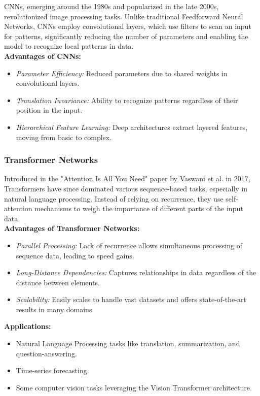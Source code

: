 CNNs, emerging around the 1980s and popularized in the late 2000s, revolutionized image processing tasks. Unlike traditional Feedforward Neural Networks, CNNs employ convolutional layers, which use filters to scan an input for patterns, significantly reducing the number of parameters and enabling the model to recognize local patterns in data.\\

\textbf{Advantages of CNNs:}
\begin{itemize}
    \item \textit{Parameter Efficiency:} Reduced parameters due to shared weights in convolutional layers.
    \item \textit{Translation Invariance:} Ability to recognize patterns regardless of their position in the input.
    \item \textit{Hierarchical Feature Learning:} Deep architectures extract layered features, moving from basic to complex.
\end{itemize}


\subsubsection*{Transformer Networks}

Introduced in the "Attention Is All You Need" paper by Vaswani et al. in 2017, Transformers have since dominated various sequence-based tasks, especially in natural language processing. Instead of relying on recurrence, they use self-attention mechanisms to weigh the importance of different parts of the input data.\\

\textbf{Advantages of Transformer Networks:}
\begin{itemize}
    \item \textit{Parallel Processing:} Lack of recurrence allows simultaneous processing of sequence data, leading to speed gains.
    \item \textit{Long-Distance Dependencies:} Captures relationships in data regardless of the distance between elements.
    \item \textit{Scalability:} Easily scales to handle vast datasets and offers state-of-the-art results in many domains.
\end{itemize}

\textbf{Applications:}
\begin{itemize}
    \item Natural Language Processing tasks like translation, summarization, and question-answering.
    \item Time-series forecasting.
    \item Some computer vision tasks leveraging the Vision Transformer architecture.
\end{itemize}

